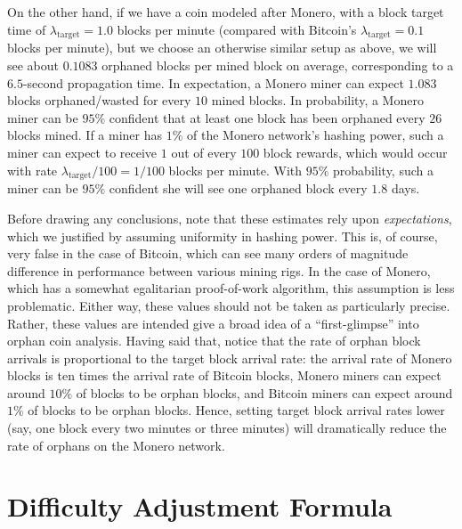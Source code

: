 \documentclass[12pt,english]{mrl}
\theoremstyle{definition}
\numberwithin{equation}{section}
\numberwithin{figure}{section}
\numberwithin{equation}{section}
\numberwithin{equation}{section}
\numberwithin{figure}{section}
\begin{document}
On the other hand, if we have a coin modeled after Monero, with a block target time of $\lambda_{\text{target}}=1.0$ blocks per minute (compared with Bitcoin's $\lambda_{\text{target}} = 0.1$ blocks per minute), but we choose an otherwise similar setup as above, we will see about $0.1083$ orphaned blocks per mined block on average, corresponding to a $6.5$-second propagation time. In expectation, a Monero miner can expect $1.083$ blocks orphaned/wasted for every $10$ mined blocks. In probability, a Monero miner can be $95\%$ confident that at least one block has been orphaned every $26$ blocks mined. If a miner has $1\%$ of the Monero network's hashing power, such a miner can expect to receive $1$ out of every $100$ block rewards, which would occur with rate $\lambda_{\text{target}}/100 = 1/100$ blocks per minute. With $95\%$ probability, such a miner can be $95\%$ confident she will see one orphaned block every $1.8$ days.

Before drawing any conclusions, note that these estimates rely upon \textit{expectations}, which we justified by assuming uniformity in hashing power. This is, of course, very false in the case of Bitcoin, which can see many orders of magnitude difference in performance between various mining rigs. In the case of Monero, which has a somewhat egalitarian proof-of-work algorithm, this assumption is less problematic. Either way, these values should not be taken as particularly precise. Rather, these values are intended give a broad idea of a ``first-glimpse'' into orphan coin analysis. Having said that, notice that the rate of orphan block arrivals is proportional to the target block arrival rate: the arrival rate of Monero blocks is ten times the arrival rate of Bitcoin blocks, Monero miners can expect around $10\%$ of blocks to be orphan blocks, and Bitcoin miners can expect around $1\%$ of blocks to be orphan blocks. Hence, setting target block arrival rates lower (say, one block every two minutes or three minutes) will dramatically reduce the rate of orphans on the Monero network.




\section{Difficulty Adjustment Formula}\label{myCode}
\end{document}
